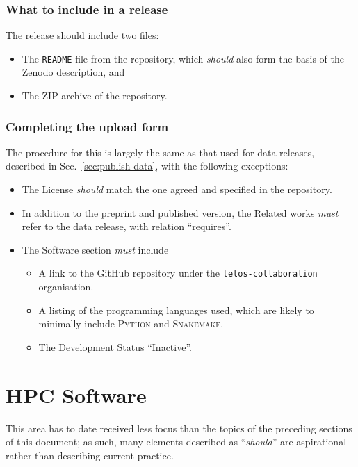 \documentclass{article}
\newcommand\rfcword[1]{\emph{#1}\xspace}
\newcommand\must{\rfcword{must}}
\newcommand\should{\rfcword{should}}
\newcommand\filename[1]{\texttt{#1}\xspace}
\newcommand\readme{\filename{README}\xspace}
\newcommand\program[1]{\textsc{#1}\xspace}
\begin{document}
\subsubsection{What to include in a release}

The release should include two files:

\begin{itemize}
  \item
        The \readme file from the repository,
        which \should also form the basis of the Zenodo description, and
  \item
        The ZIP archive of the repository.
\end{itemize}

\subsubsection{Completing the upload form}

The procedure for this is largely the same as that used for data releases,
described in Sec.~\ref{sec:publish-data},
with the following exceptions:

\begin{itemize}
  \item
        The License \should match the one agreed and specified in the repository.
  \item
        In addition to the preprint and published version,
        the Related works \must refer to the data release,
        with relation ``requires''.
  \item
        The Software section \must include
        \begin{itemize}
          \item
                A link to the GitHub repository under the \verb|telos-collaboration| organisation.
          \item
                A listing of the programming languages used,
                which are likely to minimally include
                \program{Python} and \program{Snakemake}.
          \item
                The Development Status ``Inactive''.
        \end{itemize}
\end{itemize}


\section{HPC Software}

This area has to date received less focus than
the topics of the preceding sections of this document;
as such,
many elements described as ``\should'' are aspirational
rather than describing current practice.
\end{document}
